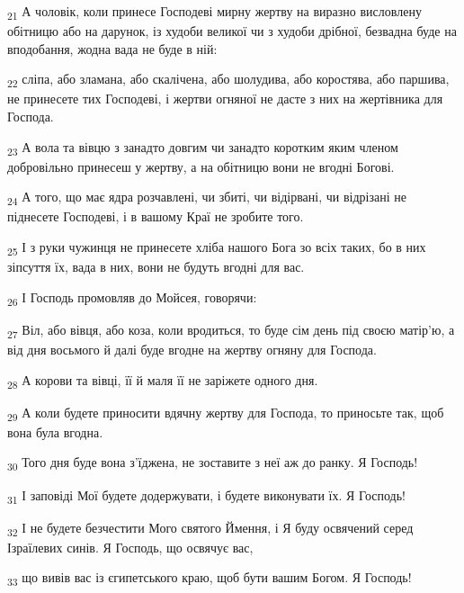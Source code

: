\begin{tcolorbox}
\textsubscript{21} А чоловік, коли принесе Господеві мирну жертву на виразно висловлену обітницю або на дарунок, із худоби великої чи з худоби дрібної, безвадна буде на вподобання, жодна вада не буде в ній:
\end{tcolorbox}
\begin{tcolorbox}
\textsubscript{22} сліпа, або зламана, або скалічена, або шолудива, або коростява, або паршива, не принесете тих Господеві, і жертви огняної не дасте з них на жертівника для Господа.
\end{tcolorbox}
\begin{tcolorbox}
\textsubscript{23} А вола та вівцю з занадто довгим чи занадто коротким яким членом добровільно принесеш у жертву, а на обітницю вони не вгодні Богові.
\end{tcolorbox}
\begin{tcolorbox}
\textsubscript{24} А того, що має ядра розчавлені, чи збиті, чи відірвані, чи відрізані не піднесете Господеві, і в вашому Краї не зробите того.
\end{tcolorbox}
\begin{tcolorbox}
\textsubscript{25} І з руки чужинця не принесете хліба нашого Бога зо всіх таких, бо в них зіпсуття їх, вада в них, вони не будуть вгодні для вас.
\end{tcolorbox}
\begin{tcolorbox}
\textsubscript{26} І Господь промовляв до Мойсея, говорячи:
\end{tcolorbox}
\begin{tcolorbox}
\textsubscript{27} Віл, або вівця, або коза, коли вродиться, то буде сім день під своєю матір'ю, а від дня восьмого й далі буде вгодне на жертву огняну для Господа.
\end{tcolorbox}
\begin{tcolorbox}
\textsubscript{28} А корови та вівці, її й маля її не заріжете одного дня.
\end{tcolorbox}
\begin{tcolorbox}
\textsubscript{29} А коли будете приносити вдячну жертву для Господа, то приносьте так, щоб вона була вгодна.
\end{tcolorbox}
\begin{tcolorbox}
\textsubscript{30} Того дня буде вона з'їджена, не зоставите з неї аж до ранку. Я Господь!
\end{tcolorbox}
\begin{tcolorbox}
\textsubscript{31} І заповіді Мої будете додержувати, і будете виконувати їх. Я Господь!
\end{tcolorbox}
\begin{tcolorbox}
\textsubscript{32} І не будете безчестити Мого святого Ймення, і Я буду освячений серед Ізраїлевих синів. Я Господь, що освячує вас,
\end{tcolorbox}
\begin{tcolorbox}
\textsubscript{33} що вивів вас із єгипетського краю, щоб бути вашим Богом. Я Господь!
\end{tcolorbox}
